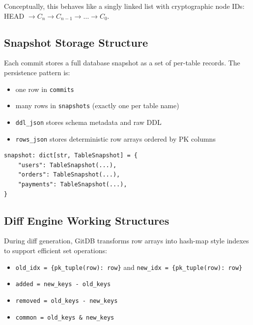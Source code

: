 \documentclass[12pt, a4paper]{article}
\begin{document}
\begin{tcolorbox}[infobox]
Conceptually, this behaves like a singly linked list with cryptographic node IDs:
HEAD $\rightarrow C_n \rightarrow C_{n-1} \rightarrow \dots \rightarrow C_0$.
\end{tcolorbox}

\subsection{Snapshot Storage Structure}

Each commit stores a full database snapshot as a set of per-table records.
The persistence pattern is:
\begin{itemize}[leftmargin=1.5em]
        \item one row in \texttt{commits}
        \item many rows in \texttt{snapshots} (exactly one per table name)
        \item \texttt{ddl\_json} stores schema metadata and raw DDL
        \item \texttt{rows\_json} stores deterministic row arrays ordered by PK columns
\end{itemize}

\begin{tcolorbox}[commandbox, title=Snapshot Container Structure]
\begin{lstlisting}
snapshot: dict[str, TableSnapshot] = {
    "users": TableSnapshot(...),
    "orders": TableSnapshot(...),
    "payments": TableSnapshot(...),
}
\end{lstlisting}
\end{tcolorbox}

\subsection{Diff Engine Working Structures}

During diff generation, GitDB transforms row arrays into hash-map style indexes
to support efficient set operations:
\begin{itemize}[leftmargin=1.5em]
        \item \texttt{old\_idx = \{pk\_tuple(row): row\}} and \texttt{new\_idx = \{pk\_tuple(row): row\}}
        \item \texttt{added = new\_keys - old\_keys}
        \item \texttt{removed = old\_keys - new\_keys}
        \item \texttt{common = old\_keys \& new\_keys}
\end{itemize}
\end{document}
